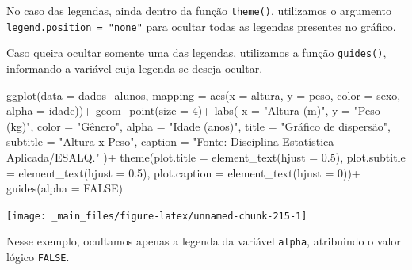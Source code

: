 \documentclass[
  brazilian,
]{book}
\newenvironment{Shaded}{\begin{snugshade}}{\end{snugshade}}
\newcommand{\AttributeTok}[1]{\textcolor[rgb]{0.77,0.63,0.00}{#1}}
\newcommand{\ConstantTok}[1]{\textcolor[rgb]{0.00,0.00,0.00}{#1}}
\newcommand{\DecValTok}[1]{\textcolor[rgb]{0.00,0.00,0.81}{#1}}
\newcommand{\FloatTok}[1]{\textcolor[rgb]{0.00,0.00,0.81}{#1}}
\newcommand{\FunctionTok}[1]{\textcolor[rgb]{0.00,0.00,0.00}{#1}}
\newcommand{\NormalTok}[1]{#1}
\newcommand{\SpecialCharTok}[1]{\textcolor[rgb]{0.00,0.00,0.00}{#1}}
\newcommand{\StringTok}[1]{\textcolor[rgb]{0.31,0.60,0.02}{#1}}
\begin{document}
No caso das legendas, ainda dentro da função \texttt{theme()}, utilizamos o argumento \texttt{legend.position\ =\ "none"} para ocultar todas as legendas presentes no gráfico.

Caso queira ocultar somente uma das legendas, utilizamos a função \texttt{guides()}, informando a variável cuja legenda se deseja ocultar.

\begin{Shaded}
\begin{Highlighting}[]
\FunctionTok{ggplot}\NormalTok{(}\AttributeTok{data =}\NormalTok{ dados\_alunos,}
       \AttributeTok{mapping =} \FunctionTok{aes}\NormalTok{(}\AttributeTok{x =}\NormalTok{ altura,}
                     \AttributeTok{y =}\NormalTok{ peso,}
                     \AttributeTok{color =}\NormalTok{ sexo,}
                     \AttributeTok{alpha =}\NormalTok{ idade))}\SpecialCharTok{+}
  \FunctionTok{geom\_point}\NormalTok{(}\AttributeTok{size =} \DecValTok{4}\NormalTok{)}\SpecialCharTok{+}
  \FunctionTok{labs}\NormalTok{(}
    \AttributeTok{x =} \StringTok{"Altura (m)"}\NormalTok{,}
    \AttributeTok{y =} \StringTok{"Peso (kg)"}\NormalTok{,}
    \AttributeTok{color =} \StringTok{"Gênero"}\NormalTok{,}
    \AttributeTok{alpha =} \StringTok{"Idade (anos)"}\NormalTok{,}
    \AttributeTok{title =} \StringTok{"Gráfico de dispersão"}\NormalTok{,}
    \AttributeTok{subtitle =} \StringTok{"Altura x Peso"}\NormalTok{,}
    \AttributeTok{caption =} \StringTok{"Fonte: Disciplina Estatística Aplicada/ESALQ."}
\NormalTok{  )}\SpecialCharTok{+}
  \FunctionTok{theme}\NormalTok{(}\AttributeTok{plot.title =} \FunctionTok{element\_text}\NormalTok{(}\AttributeTok{hjust =} \FloatTok{0.5}\NormalTok{),}
        \AttributeTok{plot.subtitle =} \FunctionTok{element\_text}\NormalTok{(}\AttributeTok{hjust =} \FloatTok{0.5}\NormalTok{),}
        \AttributeTok{plot.caption =} \FunctionTok{element\_text}\NormalTok{(}\AttributeTok{hjust =} \DecValTok{0}\NormalTok{))}\SpecialCharTok{+}
  \FunctionTok{guides}\NormalTok{(}\AttributeTok{alpha =} \ConstantTok{FALSE}\NormalTok{)}
\end{Highlighting}
\end{Shaded}

\begin{center}\texttt{[image: \_main\_files/figure-latex/unnamed-chunk-215-1]} \end{center}

Nesse exemplo, ocultamos apenas a legenda da variável \texttt{alpha}, atribuindo o valor lógico \texttt{FALSE}.
\end{document}
